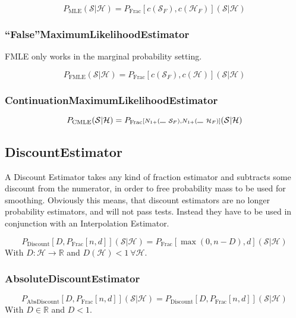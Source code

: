 \documentclass[11pt,a4paper]{article}
\newcommand{\Seq}{\mathcal{S}}
\newcommand{\Hist}{\mathcal{H}}
\newcommand{\SeqF}{\mathcal{S}_F}
\newcommand{\HistF}{\mathcal{H}_F}
\newcommand{\Skp}{\rule{7pt}{.5pt}}
\begin{document}
  \begin{equation}
    P_\mathrm{MLE}(\Seq | \Hist) = P_\mathrm{Frac}{\scriptstyle[c(\SeqF) , c(\HistF)]}(\Seq | \Hist)
  \end{equation}

  \subsubsection{``False''MaximumLikelihoodEstimator}

  FMLE only works in the marginal probability setting.

  \begin{equation}
    P_\mathrm{FMLE}(\Seq | \Hist) = P_\mathrm{Frac}{\scriptstyle[c(\SeqF) , c(\Hist)]}(\Seq | \Hist)
  \end{equation}

  \subsubsection{ContinuationMaximumLikelihoodEstimator}

  \begin{equation}
    P_\mathrm{CMLE}(\Seq | \Hist) = P_\mathrm{Frac}{\scriptstyle[N_{1+}(\Skp ~ \SeqF) , N_{1+}(\Skp ~ \HistF)]}(\Seq | \Hist)
  \end{equation}


  \subsection{DiscountEstimator}

  A Discount Estimator takes any kind of fraction estimator and subtracts some
  discount from the numerator, in order to free probability mass to be used for
  smoothing. Obviously this means, that discount estimators are no longer
  probability estimators, and will not pass tests. Instead they have to be used
  in conjunction with an Interpolation Estimator.

  \begin{equation}
    P_\mathrm{Discount}{\scriptstyle[D,P_\mathrm{Frac}[n,d]]}(\Seq | \Hist) = P_\mathrm{Frac}{\scriptstyle[\max(0,n-D),d]}(\Seq | \Hist)
  \end{equation}
  With $D: \Hist \to \mathbb{R}$ and $D(\Hist)<1 ~ \forall \Hist$.

  \subsubsection{AbsoluteDiscountEstimator}

  \begin{equation}
    P_\mathrm{AbsDiscount}{\scriptstyle[D,P_\mathrm{Frac}[n,d]]}(\Seq | \Hist) = P_\mathrm{Discount}{\scriptstyle[D,P_\mathrm{Frac}[n,d]]}(\Seq | \Hist)
  \end{equation}
  With $D \in \mathbb{R}$ and $D < 1$.
\end{document}
